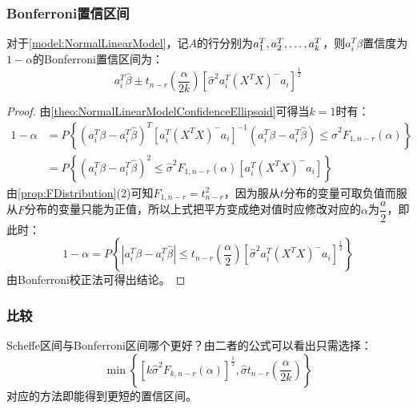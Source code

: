 \subsubsection{Bonferroni置信区间}
\begin{theorem}\label{theo:BonferroniCI}
	对于\cref{model:NormalLinearModel}，记$A$的行分别为$a^T_1, a^T_2, \dots, a^T_{k}$，则$a_
	i^T\beta$置信度为$1-\alpha$的Bonferroni置信区间为：
	\begin{equation*}
		a_i^T\hat{\beta}\pm t_{n-r}\left(\frac{\alpha}{2k}\right)[\hat{\sigma}^2a_i^T(X^TX)^-a_i]^{\frac{1}{2}}
	\end{equation*}
\end{theorem}
\begin{proof}
	由\cref{theo:NormalLinearModelConfidenceEllipsoid}可得当$k=1$时有：
	\begin{align*}
		1-\alpha&=P\left\{(a_i^T\beta-a_i^T\hat{\beta})^T[a_i^T(X^TX)^-a_i]^{-1}(a_i^T\beta-a_i^T\hat{\beta})\leqslant\hat{\sigma}^2F_{1,n-r}(\alpha)\right\} \\
		&=P\left\{(a_i^T\beta-a_i^T\hat{\beta})^2\leqslant\hat{\sigma}^2F_{1,n-r}(\alpha)[a_i^T(X^TX)^-a_i]\right\}
	\end{align*}
	由\cref{prop:FDistribution}(2)可知$F_{1,n-r}=t^2_{n-r}$，因为服从$t$分布的变量可取负值而服从$F$分布的变量只能为正值，所以上式把平方变成绝对值时应修改对应的$\alpha$为$\dfrac{a}{2}$，即此时：
	\begin{equation*}
		1-\alpha=P\left\{|a_i^T\beta-a_i^T\hat{\beta}|\leqslant t_{n-r}\left(\frac{\alpha}{2}\right)[\hat{\sigma}^2a_i^T(X^TX)^-a_i]^{\frac{1}{2}}\right\}
	\end{equation*}
	由Bonferroni校正法可得出结论。
\end{proof}
\subsubsection{比较}
\begin{derivation}
	Scheffe区间与Bonferroni区间哪个更好？由二者的公式可以看出只需选择：
	\begin{equation*}
		\min\left\{[k\hat{\sigma}^2F_{k,n-r}(\alpha)]^{\frac{1}{2}},\hat{\sigma}t_{n-r}\left(\frac{\alpha}{2k}\right)\right\}
	\end{equation*}
	对应的方法即能得到更短的置信区间。
\end{derivation}

